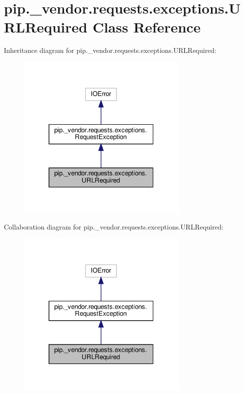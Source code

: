 \hypertarget{classpip_1_1__vendor_1_1requests_1_1exceptions_1_1URLRequired}{}\section{pip.\+\_\+vendor.\+requests.\+exceptions.\+U\+R\+L\+Required Class Reference}
\label{classpip_1_1__vendor_1_1requests_1_1exceptions_1_1URLRequired}


Inheritance diagram for pip.\+\_\+vendor.\+requests.\+exceptions.\+U\+R\+L\+Required\+:
\nopagebreak
\begin{figure}[H]
\begin{center}
\leavevmode
\includegraphics[width=241pt]{classpip_1_1__vendor_1_1requests_1_1exceptions_1_1URLRequired__inherit__graph}
\end{center}
\end{figure}


Collaboration diagram for pip.\+\_\+vendor.\+requests.\+exceptions.\+U\+R\+L\+Required\+:
\nopagebreak
\begin{figure}[H]
\begin{center}
\leavevmode
\includegraphics[width=241pt]{classpip_1_1__vendor_1_1requests_1_1exceptions_1_1URLRequired__coll__graph}
\end{center}
\end{figure}
